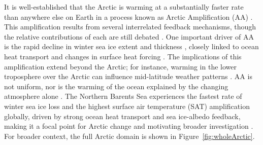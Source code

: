 \documentclass[draft]{agujournal2019}
\begin{document}
It is well-established that the Arctic is warming at a substantially faster rate than anywhere else on Earth in a process known as Arctic Amplification (AA) \cite{Manabe1980,Serreze2009,Cosimo2014,Huang2017,Rantanen2022}. This amplification results from several interrelated feedback mechanisms, though the relative contributions of each are still debated \cite{Pithan2014,Timmermans2018,Gong2017,Pistone2019,Previdi2021}. One important driver of AA is the rapid decline in winter sea ice extent and thickness \cite{Perovich2009,Dai2019}, closely linked to ocean heat transport and changes in surface heat forcing \cite{Onarheim2018,Stroeve2018,Oldenburg2024}. The implications of this amplification extend beyond the Arctic; for instance, warming in the lower troposphere over the Arctic can influence mid-latitude weather patterns \cite{Honda2009,Petoukhov2010,Francis2012,Cohen2018,Coumou2018}. AA is not uniform, nor is the warming of the ocean explained by the changing atmosphere alone \cite{Marshall2014}. The Northern Barents Sea experiences the fastest rate of winter sea ice loss and the highest surface air temperature (SAT) amplification globally, driven by strong ocean heat transport and sea ice-albedo feedback, making it a focal point for Arctic change and motivating broader investigation \cite{Screen2010,Onarheim2017,Onarheim2018,Isaksen2022,Rantanen2022}. For broader context, the full Arctic domain is shown in Figure~\ref{fig:wholeArctic}.
\end{document}
